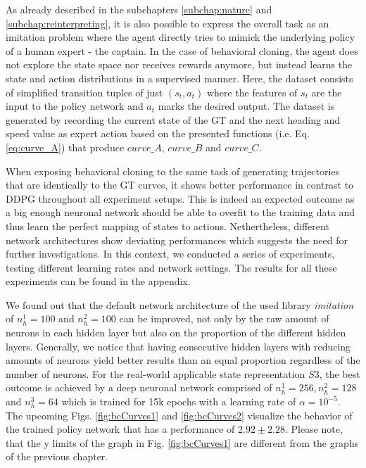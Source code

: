 As already described in the subchapters \ref{subchap:nature} and \ref{subchap:reinterpreting}, it is also possible to express the overall task as an imitation problem where the agent directly tries to mimick the underlying policy of a human expert - the captain. In the case of behavioral cloning, the agent does not explore the state space nor receives rewards anymore, but instead learns the state and action distributions in a supervised manner. Here, the dataset consists of simplified transition tuples of just $(s_t, a_t)$ where the features of $s_t$ are the input to the policy network and $a_t$ marks the desired output. The dataset is generated by recording the current state of the GT and the next heading and speed value as expert action based on the presented functions (i.e. Eq. \ref{eq:curve_A}) that produce $curve\_A$, $curve\_B$ and $curve\_C$.
\par
When exposing behavioral cloning to the same task of generating trajectories that are identically to the GT curves, it shows better performance in contrast to DDPG throughout all experiment setups. This is indeed an expected outcome as a big enough neuronal network should be able to overfit to the training data and thus learn the perfect mapping of states to actions. Nethertheless, different network architectures show deviating performances which suggests the need for further investigations. In this context, we conducted a series of experiments, testing different learning rates and network settings. The results for all these experiments can be found in the appendix.
\par
We found out that the default network architecture of the used library \textit{imitation} of $n_{h}^{1}=100$ and $n_{h}^{2}=100$ can be improved, not only by the raw amount of neurons in each hidden layer but also on the proportion of the different hidden layers. Generally, we notice that having consecutive hidden layers with reducing amounts of neurons yield better results than an equal proportion regardless of the number of neurons. For the real-world applicable state representation $S3$, the best outcome is achieved by a deep neuronal network comprised of $n_{h}^{1}=256, n_{h}^{2}=128$ and $n_{h}^{3}=64$ which is trained for 15k epochs with a learning rate of $\alpha = 10^{-5}$. The upcoming Figs. \ref{fig:bcCurves1} and \ref{fig:bcCurves2} visualize the behavior of the trained policy network that has a performance of $2.92 \pm 2.28$. Please note, that the y limits of the graph in Fig. \ref{fig:bcCurves1} are different from the graphs of the previous chapter.

